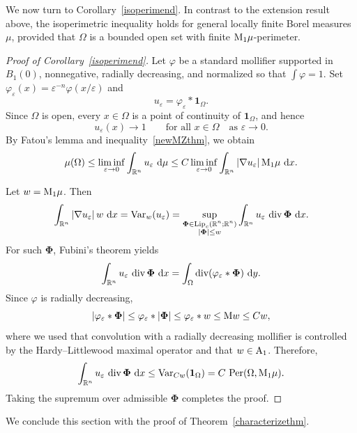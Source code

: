 \documentclass[11pt, a4paper, reqno]{amsart}
\newcommand{\R}{\mathbb R}
\newcommand{\A}{\textup A}
\newcommand{\vp}{\varphi}
\newcommand{\dx}{\,{\mathrm dx}}
\newcommand{\dmu}{\,{\mathrm d\mu}}
\newcommand{\dy}{\,{\mathrm dy}}
\DeclareMathOperator{\Lip}{\textup{Lip}}
\DeclareMathOperator{\Div}{\textup{div}}
\DeclareMathOperator{\Per}{\textup{Per}}
\theoremstyle{definition}
\theoremstyle{remark}
\begin{document}
We now turn to Corollary~\ref{isoperimend}. In contrast to the extension result above, the isoperimetric inequality holds for general locally finite Borel measures $\mu$, provided that $\Omega$ is a bounded open set with finite $\textup{M}_1\mu$-perimeter.

\begin{proof}[Proof of Corollary~\ref{isoperimend}]
Let $\vp$ be a standard mollifier supported in $B_1(0)$, nonnegative, radially decreasing, and normalized so that $\int \vp=1$. Set $\vp_\varepsilon(x)=\varepsilon^{-n}\vp(x/\varepsilon)$ and
\[
u_\varepsilon=\vp_\varepsilon * \mathbf{1}_\Omega.
\]
Since $\Omega$ is open, every $x\in\Omega$ is a point of continuity of $\mathbf{1}_\Omega$, and hence
\[
u_\varepsilon(x)\to 1 \qquad \text{for all } x\in\Omega \quad \text{as } \varepsilon\to 0.
\]
By Fatou’s lemma and inequality~\eqref{newMZthm}, we obtain
\[
\mu(\Omega)
\le \liminf_{\varepsilon\to 0} \int_{\R^n} u_\varepsilon\,\dmu
\le C \liminf_{\varepsilon\to 0} \int_{\R^n} |\nabla u_\varepsilon|\,\textup{M}_1\mu\,\dx.
\]

Let $w=\textup{M}_1\mu$. Then
\[
\int_{\R^n} |\nabla u_\varepsilon|\, w\,\dx
= \textup{Var}_{w}(u_\varepsilon)
= \sup_{\substack{\boldsymbol{\Phi}\in \Lip_c(\R^n;\R^n)\\ |\boldsymbol{\Phi}|\le w}}
\int_{\R^n} u_\varepsilon \,\Div \boldsymbol{\Phi}\,\dx.
\]
For such $\boldsymbol{\Phi}$, Fubini’s theorem yields
\[
\int_{\R^n} u_\varepsilon \,\Div \boldsymbol{\Phi}\,\dx
= \int_\Omega \Div(\vp_\varepsilon * \boldsymbol{\Phi})\,\dy.
\]
Since $\vp$ is radially decreasing,
\[
|\vp_\varepsilon * \boldsymbol{\Phi}|
\le \vp_\varepsilon * |\boldsymbol{\Phi}|
\le \vp_\varepsilon * w
\le \textup{M}w
\le C w,
\]
where we used that convolution with a radially decreasing mollifier is controlled by the Hardy--Littlewood maximal operator and that $w\in\A_1$. Therefore,
\[
\int_{\R^n} u_\varepsilon \,\Div \boldsymbol{\Phi}\,\dx
\le \textup{Var}_{Cw}(\mathbf{1}_\Omega)
= C\,\Per(\Omega,\textup{M}_1\mu).
\]
Taking the supremum over admissible $\boldsymbol{\Phi}$ completes the proof.
\end{proof}

We conclude this section with the proof of Theorem~\ref{characterizethm}.
\end{document}
